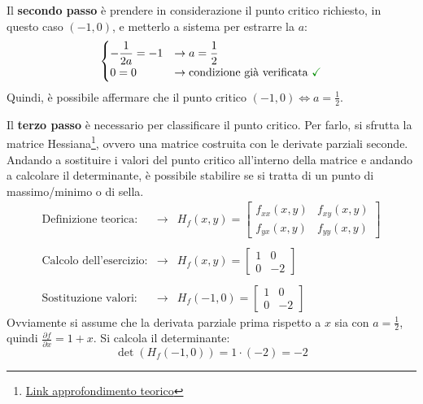 \documentclass[a4paper]{article}
\begin{document}
	\noindent
	Il \textbf{secondo passo} è prendere in considerazione il punto critico richiesto, in questo caso $\left(-1, 0\right)$, e metterlo a sistema per estrarre la $a$:
	\begin{equation*}
		\begin{cases}
			-\dfrac{1}{2a} = -1 & \rightarrow a = \dfrac{1}{2} \\
			0 = 0 & \rightarrow \text{condizione già verificata } \textcolor{Green4}{\mathbf{\checkmark}}
		\end{cases}
	\end{equation*}
	Quindi, è possibile affermare che il punto critico $\left(-1,0\right) \iff a = \frac{1}{2}$.\newline

	\noindent
	Il \textbf{terzo passo} è necessario per classificare il punto critico. Per farlo, si sfrutta la matrice Hessiana\footnote{\href{https://www.youmath.it/lezioni/analisi-due/varie/1150-massimi-e-minimi-funzioni-due-variabili.html}{Link approfondimento teorico}}, ovvero una matrice costruita con le derivate parziali seconde. Andando a sostituire i valori del punto critico all'interno della matrice e andando a calcolare il determinante, è possibile stabilire se si tratta di un punto di massimo/minimo o di sella.
	\begin{equation*}
		\begin{array}{rcl}
			\text{Definizione teorica:} &\longrightarrow& H_{f}\left(x,y\right) = \begin{bmatrix}
				f_{xx}\left(x,y\right)	& f_{xy}\left(x,y\right) \\
				f_{yx}\left(x,y\right)	& f_{yy}\left(x,y\right)
			\end{bmatrix} \\
			\\
			\text{Calcolo dell'esercizio:} &\longrightarrow& H_{f}\left(x,y\right) = \begin{bmatrix}
				1	& 0 \\
				0	& -2
			\end{bmatrix} \\
			\\
			\text{Sostituzione valori:} &\longrightarrow& H_{f}\left(-1, 0\right) = \begin{bmatrix}
				1	& 0 \\
				0	& -2
			\end{bmatrix}
		\end{array}
	\end{equation*}
	Ovviamente si assume che la derivata parziale prima rispetto a $x$ sia con $a = \frac{1}{2}$, quindi $\frac{\partial f}{\partial x} = 1+x$. Si calcola il determinante:
	\begin{equation*}
		\det\left(H_{f}\left(-1, 0\right)\right) = 1 \cdot \left(-2\right) = -2
	\end{equation*}\newpage
\end{document}
